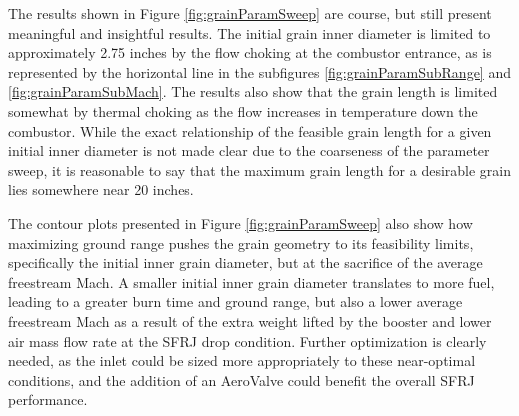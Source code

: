 The results shown in Figure \ref{fig:grainParamSweep} are course, but still present meaningful and insightful results. The initial grain inner diameter is limited to approximately 2.75 inches by the flow choking at the combustor entrance, as is represented by the horizontal line in the subfigures \ref{fig:grainParamSubRange} and \ref{fig:grainParamSubMach}. The results also show that the grain length is limited somewhat by thermal choking as the flow increases in temperature down the combustor. While the exact relationship of the feasible grain length for a given initial inner diameter is not made clear due to the coarseness of the parameter sweep, it is reasonable to say that the maximum grain length for a desirable grain lies somewhere near 20 inches. 

The contour plots presented in Figure \ref{fig:grainParamSweep} also show how maximizing ground range pushes the grain geometry to its feasibility limits, specifically the initial inner grain diameter, but at the sacrifice of the average freestream Mach. A smaller initial inner grain diameter translates to more fuel, leading to a greater burn time and ground range, but also a lower average freestream Mach as a result of the extra weight lifted by the booster and lower air mass flow rate at the SFRJ drop condition. Further optimization is clearly needed, as the inlet could be sized more appropriately to these near-optimal conditions, and the addition of an AeroValve could benefit the overall SFRJ performance.